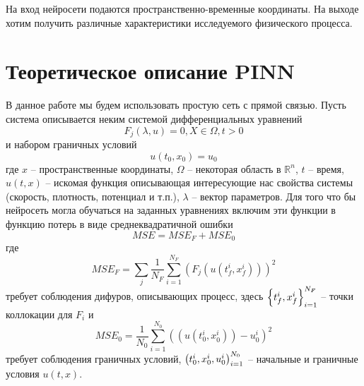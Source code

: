 \documentclass[a4paper,12pt]{article} %
\begin{document}
На вход нейросети подаются пространственно-временные координаты. На выходе хотим получить различные характеристики исследуемого физического процесса.
\newpage

\section{Теоретическое описание PINN}

В данное работе мы будем использовать простую сеть с прямой связью. Пусть система описывается неким системой дифференциальных уравнений 
\begin{equation}F_j(\lambda, u) = 0, X\in\Omega, t > 0\end{equation}
и набором граничных условий 
\begin{equation}u(t_0, x_0) = u_0\end{equation} 
где $x$ -- пространственные координаты, $\Omega$ -- некоторая область в $\mathbb{R}^n$, $t$ -- время, $u(t,x)$ -- искомая функция описывающая интересующие нас свойства системы (скорость, плотность, потенциал и т.п.), $\lambda$ -- вектор параметров. Для того что бы нейросеть могла обучаться на заданных уравнениях включим эти функции в функцию потерь в виде среднеквадратичной ошибки 
\begin{equation}
    MSE = MSE_F + MSE_0
\end{equation}
где
\begin{equation}
    MSE_F = \sum_j\frac{1}{N_F}\sum_{i=1}^{N_F} (F_j(u(t^i_f, x^i_f)))^2
\end{equation}
требует соблюдения дифуров, описывающих процесс, здесь ${\left\{ t^i_f, x^i_f \right\}}_{i=1}^{N_F}$ -- точки коллокации для $F_i$ и 
\begin{equation}
    MSE_0 = \frac{1}{N_0}\sum_{i=1}^{N_0} ((u(t^i_0, x^i_0)) - u^i_0)^2
\end{equation}
требует соблюдения граничных условий, ${\left( t^i_0, x^i_0, u^i_0 \right)}_{i=1}^{N_0}$ -- начальные и граничные условия $u(t,x)$.
\end{document}
